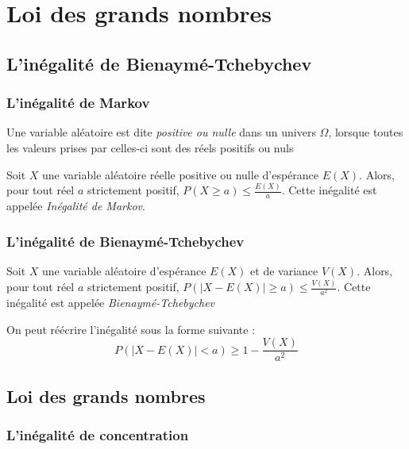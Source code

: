 \chapter{Loi des grands nombres}
\section{L'inégalité de Bienaymé-Tchebychev}
\subsection{L'inégalité de Markov}

\begin{definition}
    Une variable aléatoire est dite \textit{positive ou nulle} dans un univers \(\Omega\), lorsque toutes les valeurs prises par celles-ci sont des réels positifs ou nuls 
\end{definition}

\begin{theorem}
    Soit \(X\) une variable aléatoire réelle positive ou nulle d'espérance \(E(X)\). Alors, pour tout réel \(a\) strictement positif, \(P(X\geq a)\leq \frac{E(X)}{a}\). Cette inégalité est appelée \textit{Inégalité de Markov}.
\end{theorem}

\subsection{L'inégalité de Bienaymé-Tchebychev}

\begin{theorem}
    Soit \(X\) une variable aléatoire d'espérance \(E(X)\) et de variance \(V(X)\). Alors, pour tout réel \(a\) strictement positif, \(P(\lvert X-E(X) \rvert \geq a ) \leq \frac{V(X)}{a^{2}}\). Cette inégalité est appelée \textit{Bienaymé-Tchebychev} 
\end{theorem}

\begin{corollary}[Propriété]
    On peut réécrire l'inégalité sous la forme suivante : 
    \[
        P(\lvert X-E(X) \rvert < a) \geq 1- \frac{V(X)}{a^{2}}
    \]
\end{corollary}

\section{Loi des grands nombres}
\subsection{L'inégalité de concentration}

